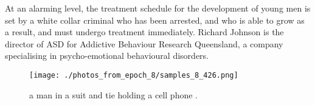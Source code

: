 \documentclass{article}%
\begin{document}
At an alarming level, the treatment schedule for the development of young men is set by a white collar criminal who has been arrested, and who is able to grow as a result, and must undergo treatment immediately.\newline%
Richard Johnson is the director of ASD for Addictive Behaviour Research Queensland, a company specialising in psycho{-}emotional behavioural disorders.\newline%

%


\begin{figure}[h!]%
\centering%
\texttt{[image: ./photos\_from\_epoch\_8/samples\_8\_426.png]}%
\caption{a man in a suit and tie holding a cell phone .}%
\end{figure}

%
\end{document}
